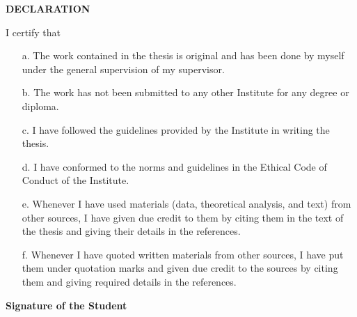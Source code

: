 \begin{center}
{\Large {\bf \uppercase{Declaration}}}
\end{center}
\thispagestyle{plain}
\noindent I certify that 

\begin{itemize}
\item[a.] The work contained in the thesis is original and has been done by myself under the general supervision of my supervisor.
\item[b.] The work has not been submitted to any other Institute for any degree or diploma. 
\item[c.] I have followed the guidelines provided by the Institute in writing the thesis. 
\item[d.] I have conformed to the norms and guidelines in the Ethical Code of Conduct of the Institute. 
\item[e.] Whenever I have used materials (data, theoretical analysis, and text) from other sources, I have given due credit to them by citing them in the text of the thesis and giving their details in the references. 
\item[f.] Whenever I have quoted written materials from other sources, I have put them under quotation marks and given due credit to the sources by citing them and giving required details in the references. 
\end{itemize}

\begin{flushright}
\begin{minipage}[c]{0.5\textwidth}
\vspace{3\baselineskip}
{\large \bf Signature of the Student} \\
\end{minipage}
\end{flushright}

\vspace{\baselineskip}

